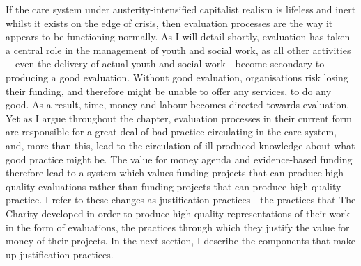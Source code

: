 If the care system under austerity-intensified capitalist realism is lifeless and inert whilst it exists on the edge of crisis, then evaluation processes are the way it appears to be functioning normally. As I will detail shortly, evaluation has taken a central role in the management of youth and social work, as all other activities—even the delivery of actual youth and social work—become secondary to producing a good evaluation. Without good evaluation, organisations risk losing their funding, and therefore might be unable to offer any services, to do any good. As a result, time, money and labour becomes directed towards evaluation. Yet as I argue throughout the chapter, evaluation processes in their current form are responsible for a great deal of bad practice circulating in the care system, and, more than this, lead to the circulation of ill-produced knowledge about what good practice might be. The value for money agenda and evidence-based funding therefore lead to a system which values funding projects that can produce high-quality evaluations rather than funding projects that can produce high-quality practice. I refer to these changes as justification practices—the practices that The Charity developed in order to produce high-quality representations of their work in the form of evaluations, the practices through which they justify the value for money of their projects. In the next section, I describe the components that make up justification practices.

